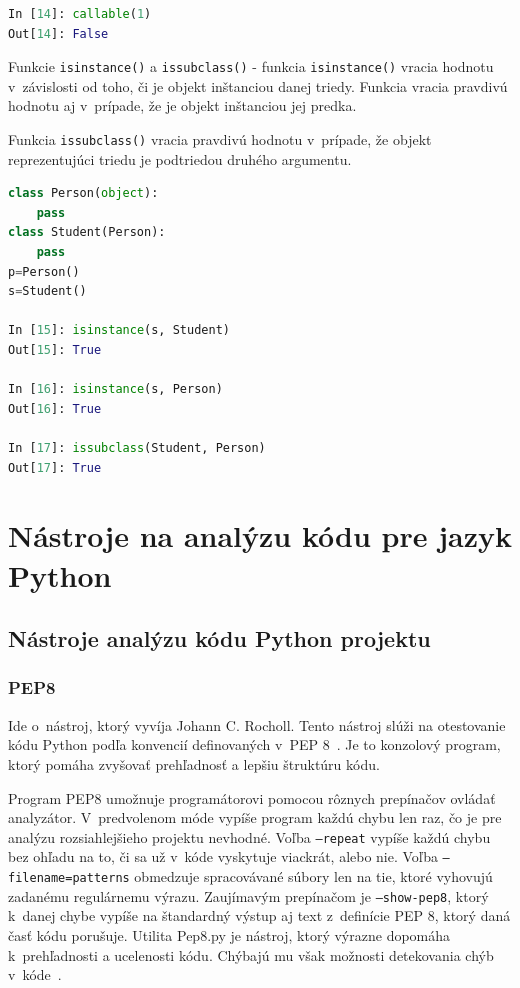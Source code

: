 \documentclass[11pt,oneside,final]{fithesis2}
\begin{document}
\begin{list}{•}{}
\begin{lstlisting}[language=python]
In [14]: callable(1)
Out[14]: False
\end{lstlisting}			


		\item Funkcie \texttt{isinstance()} a \texttt{issubclass()} - 
		funkcia \texttt{isinstance()} vracia hodnotu v~závislosti od toho, či je objekt inštanciou danej triedy. Funkcia vracia pravdivú hodnotu aj v~prípade, že je objekt inštanciou jej predka.
		
		Funkcia \texttt{issubclass()} vracia pravdivú hodnotu v~prípade, že objekt reprezentujúci triedu je podtriedou druhého argumentu.

\begin{lstlisting}[language=python]	
class Person(object):
    pass
class Student(Person):
    pass
p=Person()
s=Student()

In [15]: isinstance(s, Student)
Out[15]: True

In [16]: isinstance(s, Person)
Out[16]: True

In [17]: issubclass(Student, Person)
Out[17]: True
\end{lstlisting}		

\end{list}


\chapter{Nástroje na analýzu kódu pre jazyk Python}
	\section{Nástroje analýzu kódu Python projektu}	


\subsection{PEP8}
	Ide o~nástroj, ktorý vyvíja Johann C. Rocholl. Tento nástroj slúži na otestovanie kódu Python podľa konvencií definovaných v~PEP 8~\cite{pep8}. Je to konzolový program, ktorý pomáha zvyšovať prehľadnosť a lepšiu štruktúru kódu. 
	
	Program PEP8 umožnuje programátorovi pomocou rôznych prepínačov ovládať analyzátor. V~predvolenom móde vypíše program každú chybu len raz, čo je pre analýzu rozsiahlejšieho projektu nevhodné. Voľba \texttt{–repeat} vypíše každú chybu bez ohľadu na to, či sa už v~kóde vyskytuje viackrát, alebo nie. Voľba \texttt{–filename=patterns} obmedzuje spracovávané súbory len na tie, ktoré vyhovujú zadanému regulárnemu výrazu. Zaujímavým prepínačom je \texttt{–show-pep8}, ktorý k~danej chybe vypíše na štandardný výstup aj text z~definície PEP 8, ktorý daná časť kódu porušuje.
    Utilita Pep8.py je nástroj, ktorý výrazne dopomáha k~prehľadnosti a ucelenosti kódu. Chýbajú mu však možnosti detekovania chýb v~kóde~\cite{pep8}.
\end{document}
